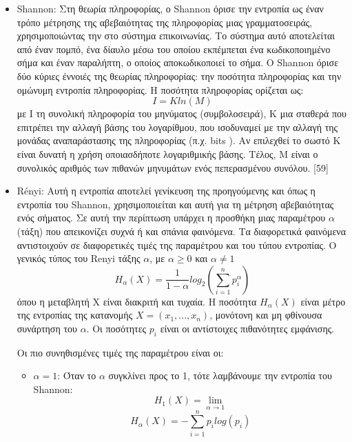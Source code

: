 \begin{itemize}
	\item \en Shannon: \gr Στη θεωρία πληροφορίας, ο \en Shannon \gr  όρισε την εντροπία ως έναν τρόπο μέτρησης της αβεβαιότητας της πληροφορίας μιας γραμματοσειράς, χρησιμοποιώντας την στο σύστημα επικοινωνίας. Το σύστημα αυτό αποτελείται από έναν πομπό, ένα δίαυλο μέσω του οποίου εκπέμπεται ένα κωδικοποιημένο σήμα και έναν παραλήπτη, ο οποίος αποκωδικοποιεί το σήμα. Ο \en Shannon \gr όρισε δύο κύριες έννοιές της θεωρίας πληροφορίας: την ποσότητα πληροφορίας και την ομώνυμη εντροπία πληροφορίας. Η ποσότητα πληροφορίας ορίζεται ως:
	\begin{equation}
		I = K ln (M)
	\end{equation}
	με Ι τη συνολική πληροφορία του μηνύματος (συμβολοσειρά), Κ μια σταθερά που επιτρέπει την αλλαγή βάσης του λογαρίθμου, που ισοδυναμεί με την αλλαγή της μονάδας αναπαράστασης της πληροφορίας (π.χ. \en bits \gr). Αν επιλεχθεί το σωστό Κ είναι δυνατή η χρήση οποιασδήποτε λογαριθμικής βάσης. Τέλος, Μ είναι ο συνολικός αριθμός των πιθανών μηνυμάτων ενός πεπερασμένου συνόλου. [59]
	\item \en Rényi: \gr Αυτή η εντροπία αποτελεί γενίκευση της προηγούμενης και όπως η εντροπία του \en Shannon, \gr χρησιμοποιείται και αυτή για τη μέτρηση αβεβαιότητας ενός σήματος. Σε αυτή την περίπτωση υπάρχει η προσθήκη μιας παραμέτρου $\alpha$ (τάξη) που απεικονίζει συχνά ή και σπάνια φαινόμενα. Τα διαφορετικά φαινόμενα αντιστοιχούν σε διαφορετικές τιμές της παραμέτρου και του τύπου εντροπίας. Ο γενικός τύπος του \en Renyi \gr τάξης $\alpha$, \gr με $\alpha \geq 0$ και $\alpha \neq 1$
	\begin{equation}
		H_\alpha (X) = \frac{1}{1 - \alpha} log_2 (\sum_{i=1}^{n}{p_i^\alpha})
	\end{equation}
	όπου η μεταβλητή Χ είναι διακριτή και τυχαία. Η ποσότητα \en $H_\alpha (X)$ \gr είναι μέτρο της εντροπίας της κατανομής $ X = (x_1, ..., x_n)$, μονότονη και μη φθίνουσα συνάρτηση του $\alpha$. Οι ποσότητες $p_i$ είναι οι αντίστοιχες πιθανότητες εμφάνισης.
	\par
	Οι πιο συνηθισμένες τιμές της παραμέτρου είναι οι:
	\begin{itemize}
		\item $\alpha = 1$: Όταν το $\alpha$ συγκλίνει προς το 1, τότε λαμβάνουμε την εντροπία του \en Shannon: \gr
		\begin{equation}
			H_1 (X) = \lim_{\alpha \to 1}
		\end{equation}
		\begin{equation}
			H_\alpha (X) = - \sum_{i=1}^{n}{p_i} log (p_i)
		\end{equation}
		

\end{itemize}
\end{itemize}
